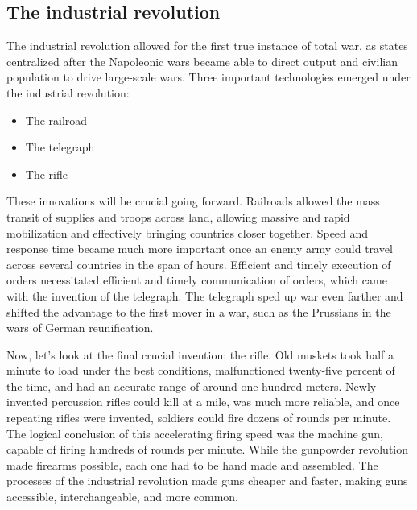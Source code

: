 \documentclass[nobib]{tufte-handout}
\begin{document}
\subsection{The industrial revolution}

The industrial revolution allowed for the first true instance of total war, 
as states centralized after the Napoleonic wars became able to direct 
output and civilian population to drive large-scale wars. Three important 
technologies emerged under the industrial revolution:
\begin{itemize}
    \item The railroad
    \item The telegraph
    \item The rifle
\end{itemize}
These innovations will be crucial going forward. Railroads allowed 
the mass transit of supplies and troops across land, allowing massive 
and rapid mobilization and effectively bringing countries closer together. 
Speed and response time became much more important once an enemy army could travel across 
several countries in the span of hours. Efficient and timely execution of 
orders necessitated efficient and timely communication of orders, 
which came with the invention of the telegraph. The telegraph sped 
up war even farther and shifted the advantage to the first mover in a war,
such as the Prussians in the wars of German reunification. 

Now, let's look at the final crucial invention: the rifle. 
Old muskets took half a minute to load under the best conditions, 
malfunctioned twenty-five percent of the time, and had 
an accurate range of around one hundred meters. Newly 
invented percussion rifles could kill at a mile, was much 
more reliable, and once repeating rifles were invented, 
soldiers could fire dozens of rounds per minute. The logical 
conclusion of this accelerating firing speed was the machine gun, 
capable of firing hundreds of rounds per minute. 
While the gunpowder revolution made firearms possible, 
each one had to be hand made and assembled. The processes 
of the industrial revolution made guns cheaper and faster, 
making guns accessible, interchangeable, and more common. 
\end{document}
